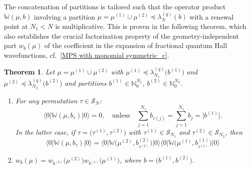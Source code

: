 \documentclass[letterpaper, DIV=17]{scrartcl}
\newtheorem{theorem}{Theorem}[section]  %
\numberwithin{equation}{section}
\theoremstyle{definition}
\begin{document}
The concatenation of partitions is tailored such that the operator product  $\mathbb{W}(\mu,b) $ involving a partition $\mu =  \mu^{(1)} \cup \mu^{(2)} \preceq \lambda^{(q)}_N(b) $ with a renewal point at $ N_1 < N $ is multiplicative. This is proven in the following theorem, which also establishes the crucial factorization property of the geometry-independent part $ w_b(\mu ) $ of the coefficient in the expansion of fractional quantum Hall wavefunctions, cf.~\eqref{MPS with monomial symmetric_c}. 
%
\begin{theorem}\label{thm:factorizationw}
Let $ \mu= \mu^{(1)} \cup \mu^{(2)}  $ with $\mu^{(1)} \preceq \lambda^{(q)}_{N_1}\big(b^{(1)}\big)$ and $\mu^{(2)}\preceq \lambda^{(q)}_{N_2}\big(b^{(2)}\big)$ and partitions $ b^{(1)} \in \mathbb{N}_0^{N_1} $, $ b^{(2)} \in \mathbb{N}_0^{N_2} $. 
\begin{enumerate}
\item  For any permutation $ \tau \in \mathcal{S}_N $:
\begin{equation}\label{eq:nullity}
\langle 0 \vert \mathbb{W}(\mu,b_\tau) \vert 0 \rangle = 0  ,\quad 
\mbox{unless} \quad \sum_{j=1}^{N_1} b_{\tau(j)} =  \sum_{j=1}^{N_1} b_{j} = \vert b^{(1)} \vert .
\end{equation}
In the latter case, if $ \tau = \big(\tau^{(1)}, \tau^{(2)} \big) $ with $ \tau^{(1)} \in \mathcal{S}_{N_1} $ and $  \tau^{(2)} \in \mathcal{S}_{N_2} $, then 
\begin{equation}\label{eq:frstprodrule}
\langle 0 \vert \mathbb{W}(\mu,b_\tau) \vert 0 \rangle = \langle 0 \vert \mathbb{W}\big(\mu^{(2)} ,b^{(2)}_{\tau^{(2)}}\big) \vert 0 \rangle  \langle 0 \vert \mathbb{W}\big(\mu^{(1)} ,b^{(1)}_{\tau^{(1)}}\big) \vert 0 \rangle
\end{equation}
\item $ \displaystyle  w_b(\mu) = w_{b^{(2)}}\big(\mu^{(2)} \big) w_{b^{(1)}}\big(\mu^{(1)} \big) $, where $b = \big(b^{(1)},b^{(2)}\big) $.
\end{enumerate}
\end{theorem}
\end{document}
